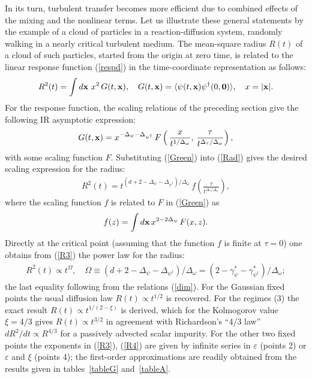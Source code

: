 \documentclass[12pt]{iopart}
\begin{document}
In its turn, turbulent transfer becomes more
efficient due to combined effects of the mixing and the nonlinear terms.
Let us illustrate these general statements by the example of a cloud of
particles in a reaction-diffusion system, randomly walking in a nearly critical turbulent medium. The
mean-square radius $R(t)$ of a cloud of such particles, started from the
origin at zero time, is related to the linear response function
(\ref{respd}) in the time-coordinate representation as follows:
\begin{eqnarray}
R^{2}(t) = \int d{\bf x}\ x^{2}\, G(t,{\bf x}), \quad
G(t,{\bf x}) = \langle \psi (t,{\bf x}) \psi^{\dag} (0,{\bf 0}) \rangle,
\quad x=|{\bf x}|.
\label{Rad}
\end{eqnarray}
For the response function, the scaling relations of the preceding section
give the following IR asymptotic expression:
\begin{eqnarray}
G(t,{\bf x}) = x^{-\Delta_{\psi}-\Delta_{\psi^{\dag}}} \, F
\left(\, \frac{x} { t^ {1/\Delta_{\omega}} }, \,
\frac{\tau}{t^{\Delta_{\tau}/\Delta_{\omega}}}  \right),
\label{Green}
\end{eqnarray}
with some scaling function $F$. Substituting (\ref{Green}) into (\ref{Rad})
gives the desired scaling expression for the radius:
\begin{eqnarray}
R^2(t) = t^{ (d+2 -\Delta_{\psi}-\Delta_{\psi^{\dag}})/\Delta_{\omega} }
\, f \left( \frac{\tau}{t^{\Delta_{\tau}/\Delta_{\omega}}}  \right),
\label{R3}
\end{eqnarray}
where the scaling function $f$ is related to $F$ in (\ref{Green}) as
\[ f (z) = \int d{\bf x}\, x^{2-2\Delta_{\psi}} \, F(x,z). \]
Directly at the critical point (assuming that the function $f$ is finite
at $\tau=0$) one obtains from (\ref{R3}) the power law for the radius:
\begin{eqnarray}
R^2(t) \propto t^\Omega, \quad \Omega \equiv { (d+2
-\Delta_{\psi}-\Delta_{\psi^{\dag}})/ \Delta_{\omega} } =
{(2-\gamma_{\psi}^{*}-\gamma_{\psi^{\dag}}^{*})/\Delta_{\omega} };
\label{R4}
\end{eqnarray}
the last equality following from the relations (\ref{dim}). For the Gaussian
fixed points the usual diffusion law $R(t)\propto t^{1/2}$ is recovered.
For the regimes (3) the exact result $R(t)\propto t^{1/(2-\xi)}$ is derived,
which for the Kolmogorov value $\xi=4/3$ gives $R(t)\propto t^{3/2}$ in
agreement with Richardson's ``4/3 law'' $dR^{2}/dt \propto R^{4/3}$ for a
passively advected scalar impurity. For the other two fixed points the
exponents in (\ref{R3}), (\ref{R4}) are given by infinite series in
$\varepsilon$ (points 2) or $\varepsilon$ and $\xi$ (points 4); the
first-order approximations are readily obtained from the results given
in tables~\ref{tableG} and~\ref{tableA}.
\end{document}
